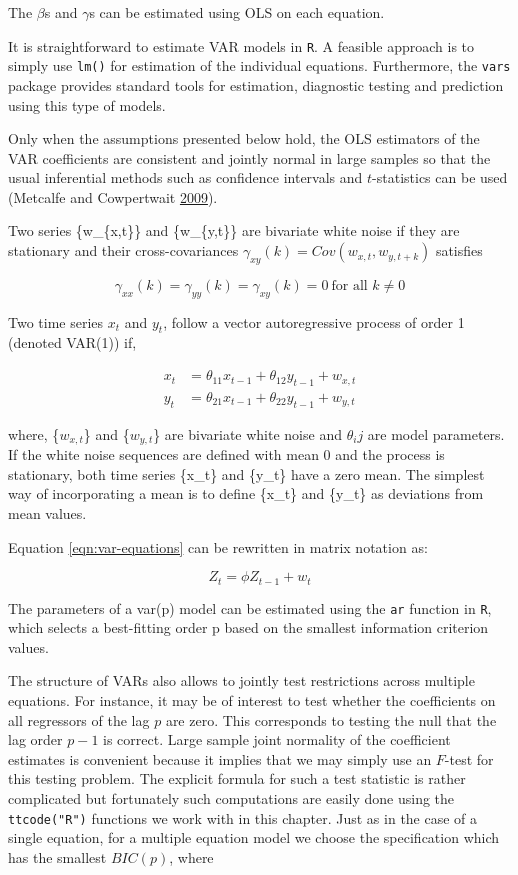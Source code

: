 \documentclass[12pt,]{article}
\begin{document}
The \(\beta\)s and \(\gamma\)s can be estimated using OLS on each equation.

It is straightforward to estimate VAR models in \texttt{R}. A feasible approach is to simply use \texttt{lm()} for estimation of the individual equations. Furthermore, the \texttt{vars} package provides standard tools for estimation, diagnostic testing and prediction using this type of models.

Only when the assumptions presented below hold, the OLS estimators of the VAR coefficients are consistent and jointly normal in large samples so that the usual inferential methods such as confidence intervals and \(t\)-statistics can be used (Metcalfe and Cowpertwait \protect\hyperlink{ref-metcalfe2009introductory}{2009}).

Two series \{w\_\{x,t\}\} and \{w\_\{y,t\}\} are bivariate white noise if they are stationary and their cross-covariances \(\gamma_{xy}(k) = Cov(w_{x,t}, w_{y, t+k})\) satisfies

\[
\gamma_{xx}(k) = \gamma_{yy}(k) = \gamma_{xy}(k) = 0\ \text{for all } k \neq 0
\]

Two time series \({x_t}\) and \({y_t}\), follow a vector autoregressive process of order 1 (denoted VAR(1)) if,

\begin{equation}
\label{eqn:var-equations}
\begin{aligned}
x_t &= \theta_{11} x_{t-1} + \theta_{12} y_{t-1} + w_{x,t} \\
y_t &= \theta_{21} x_{t-1} + \theta_{22} y_{t-1} + w_{y,t}
\end{aligned}
\end{equation}

where, \{\(w_{x,t}\)\} and \{\(w_{y,t}\)\} are bivariate white noise and \(\theta_ij\) are model parameters. If the white noise sequences are defined with mean 0 and the process is stationary, both time series \{x\_t\} and \{y\_t\} have a zero mean. The simplest way of incorporating a mean is to define \{x\_t\} and \{y\_t\} as deviations from mean values.

Equation \ref{eqn:var-equations} can be rewritten in matrix notation as:

\[
Z_t = \phi Z_{t-1} + w_t
\]

The parameters of a var(p) model can be estimated using the \texttt{ar} function in \texttt{R}, which
selects a best-fitting order p based on the smallest information criterion values.

The structure of VARs also allows to jointly test restrictions across multiple equations. For instance, it may be of interest to test whether the coefficients on all regressors of the lag \(p\) are zero. This corresponds to testing the null that the lag order \(p-1\) is correct. Large sample joint normality of the coefficient estimates is convenient because it implies that we may simply use an \(F\)-test for this testing problem. The explicit formula for such a test statistic is rather complicated but fortunately such computations are easily done using the \texttt{ttcode("R")} functions we work with in this chapter. Just as in the case of a single equation, for a multiple equation model we choose the specification which has the smallest \(BIC(p)\), where
\end{document}
